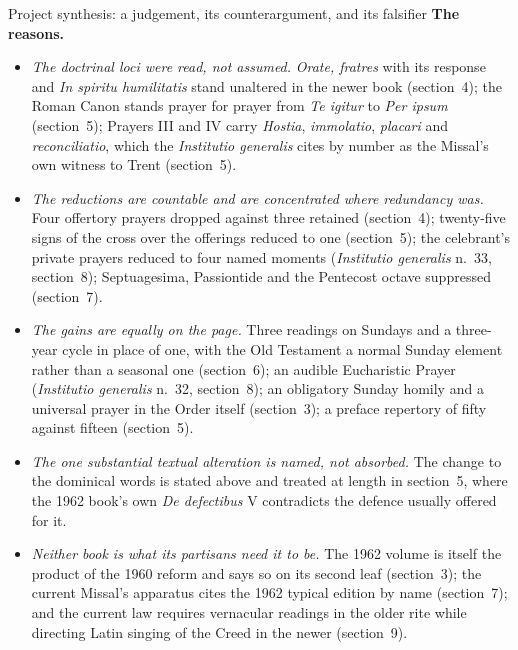 \begin{studybox}{Project synthesis: a judgement, its counterargument, and its falsifier}
\smallskip
\textbf{The reasons.}
\begin{itemize}[itemsep=0.15em,topsep=0.25em]
\item \emph{The doctrinal loci were read, not assumed.} \emph{Orate, fratres} with its response and \emph{In spiritu humilitatis} stand unaltered in the newer book (section~4); the Roman Canon stands prayer for prayer from \emph{Te igitur} to \emph{Per ipsum} (section~5); Prayers III and IV carry \emph{Hostia}, \emph{immolatio}, \emph{placari} and \emph{reconciliatio}, which the \emph{Institutio generalis} cites by number as the Missal's own witness to Trent (section~5).
\item \emph{The reductions are countable and are concentrated where redundancy was.} Four offertory prayers dropped against three retained (section~4); twenty-five signs of the cross over the offerings reduced to one (section~5); the celebrant's private prayers reduced to four named moments (\emph{Institutio generalis} n.~33, section~8); Septuagesima, Passiontide and the Pentecost octave suppressed (section~7).
\item \emph{The gains are equally on the page.} Three readings on Sundays and a three-year cycle in place of one, with the Old Testament a normal Sunday element rather than a seasonal one (section~6); an audible Eucharistic Prayer (\emph{Institutio generalis} n.~32, section~8); an obligatory Sunday homily and a universal prayer in the Order itself (section~3); a preface repertory of fifty against fifteen (section~5).
\item \emph{The one substantial textual alteration is named, not absorbed.} The change to the dominical words is stated above and treated at length in section~5, where the 1962 book's own \emph{De defectibus} V contradicts the defence usually offered for it.
\item \emph{Neither book is what its partisans need it to be.} The 1962 volume is itself the product of the 1960 reform and says so on its second leaf (section~3); the current Missal's apparatus cites the 1962 typical edition by name (section~7); and the current law requires vernacular readings in the older rite while directing Latin singing of the Creed in the newer (section~9).
\end{itemize}


\end{studybox}
